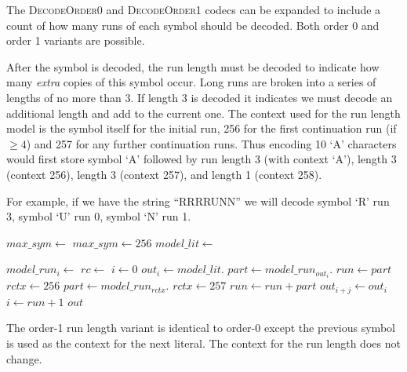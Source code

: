 \documentclass[a4paper]{article}
\begin{document}
The \textsc{DecodeOrder0} and \textsc{DecodeOrder1} codecs can be expanded to include a count of how many runs of each symbol should be decoded.
Both order 0 and order 1 variants are possible.

After the symbol is decoded, the run length must be decoded to
indicate how many \emph{extra} copies of this symbol occur.  Long runs
are broken into a series of lengths of no more than 3.  If length 3
is decoded it indicates we must decode an additional length and add to
the current one.  The context used for the run length model is the
symbol itself for the initial run, 256 for the first continuation run
(if $\ge 4$) and 257 for any further continuation runs.  Thus encoding
10 `A' characters would first store symbol `A' followed by run length
3 (with context `A'), length 3 (context 256), length 3 (context
257), and length 1 (context 258).

For example, if we have the string ``RRRRUNN'' we will decode
symbol `R' run 3, symbol `U' run 0, symbol `N' run 1.

\begin{algorithmic}[1]
  \State $max\_sym \gets $
    \State $max\_sym \gets 256$
  \EndIf
  \State $model\_lit \gets $

    \State $model\_run_i \gets $
  \EndFor
  \Statex
  \State $rc \gets $
  \State $i \gets 0$
    \State $out_i \gets model\_lit.$
    \State $part \gets model\_run_{out_i}.$
    \State $run \gets part$
    \State $rctx \gets 256$
      \State $part \gets model\_run_{rctx}.$
      \State $rctx \gets 257$
      \State $run \gets run + part$
    \EndWhile
      \State $out_{i+j} \gets out_i$
    \EndFor
    \State $i \gets run+1$
  \EndWhile
  \State \Return $out$
\EndFunction
\end{algorithmic}

The order-1 run length variant is identical to order-0 except the
previous symbol is used as the context for the next literal.  The
context for the run length does not change.
\end{document}
